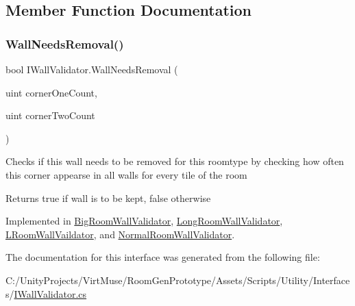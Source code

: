 \subsection{Member Function Documentation}
\mbox{\label{interface_i_wall_validator_a1618acf45bf2614985aeb8b240bf7da8}} 
\subsubsection{\texorpdfstring{Wall\+Needs\+Removal()}{WallNeedsRemoval()}}
{\footnotesize\ttfamily bool I\+Wall\+Validator.\+Wall\+Needs\+Removal (\begin{DoxyParamCaption}\item[{uint}]{corner\+One\+Count,  }\item[{uint}]{corner\+Two\+Count }\end{DoxyParamCaption})}



Checks if this wall needs to be removed for this roomtype by checking how often this corner appearse in all walls for every tile of the room 

\begin{DoxyReturn}{Returns}
true if wall is to be kept, false otherwise
\end{DoxyReturn}


Implemented in \mbox{\hyperlink{class_big_room_wall_validator_abc5968ccc9e70e3d5b8de7ccff2c69bb}{Big\+Room\+Wall\+Validator}}, \mbox{\hyperlink{class_long_room_wall_validator_a552c1bbadec7bc3ab93a3fae2e512ebe}{Long\+Room\+Wall\+Validator}}, \mbox{\hyperlink{class_l_room_wall_vaildator_a1de3495c1d8cc0a4591b617d2137b497}{L\+Room\+Wall\+Vaildator}}, and \mbox{\hyperlink{class_normal_room_wall_validator_a30c0496c8203077f3c327da93f38f7c7}{Normal\+Room\+Wall\+Validator}}.



The documentation for this interface was generated from the following file\+:\begin{DoxyCompactItemize}
\item 
C\+:/\+Unity\+Projects/\+Virt\+Muse/\+Room\+Gen\+Prototype/\+Assets/\+Scripts/\+Utility/\+Interfaces/\mbox{\hyperlink{_i_wall_validator_8cs}{I\+Wall\+Validator.\+cs}}\end{DoxyCompactItemize}
